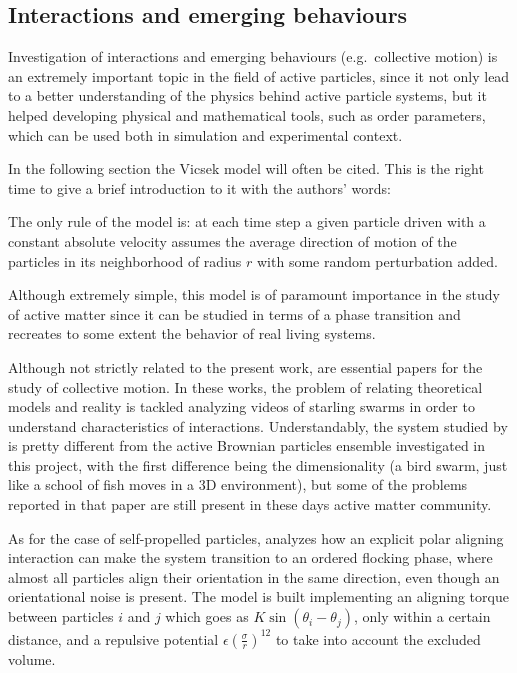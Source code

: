 \documentclass[../../master_thesis_np.tex]{subfiles}
\begin{document}
	\subsection{Interactions and emerging behaviours}
	Investigation of interactions and emerging behaviours (e.g.\ collective motion) is an extremely important topic in the field of active particles, since it not only lead to a better understanding of the physics behind active particle systems, but it helped developing physical and mathematical tools, such as order parameters, which can be used both in simulation and experimental context. 
	
	In the following section the Vicsek model will often be cited. 
	This is the right time to give a brief introduction to it with the authors' words:
	 \begin{displayquote}
		The only rule of the model is: at each time step a given particle driven with a constant absolute velocity assumes the average direction of motion of the particles in its neighborhood of radius $r$ with some random perturbation added.\cite{vicsek_novel_1995}
	 \end{displayquote}
	Although extremely simple, this model is of paramount importance in the study of active matter since it can be studied in terms of a phase transition and recreates to some extent the behavior of real living systems.
	
	Although not strictly related to the present work, \cite{cavagna_empirical_2010, ballerini_interaction_2008} are essential papers for the study of collective motion.
	In these works, the problem of relating theoretical models and reality is tackled analyzing videos of starling swarms in order to understand characteristics of interactions. %
	Understandably, the system studied by \citeauthor{cavagna_empirical_2010, ballerini_interaction_2008} \cite{cavagna_empirical_2010, ballerini_interaction_2008} is pretty different from the active Brownian particles ensemble investigated in this project, with the first difference being the dimensionality (a bird swarm, just like a school of fish moves in a 3D environment), but some of the problems reported in that paper are still present in these days active matter community.
	
	As for the case of self-propelled particles, \cite{martin-gomez_collective_2018} analyzes how an explicit polar aligning interaction can make the system transition to an ordered flocking phase, where almost all particles align their orientation in the same direction, even though an orientational noise is present. 
	The model is built implementing an aligning torque between particles $i$ and $j$ which goes as $K \sin{(\theta_{i} - \theta_{j})}$, only within a certain distance, and a repulsive potential $\epsilon \left(\frac{\sigma}{r}\right)^{12}$ to take into account the excluded volume.
	
\end{document}
